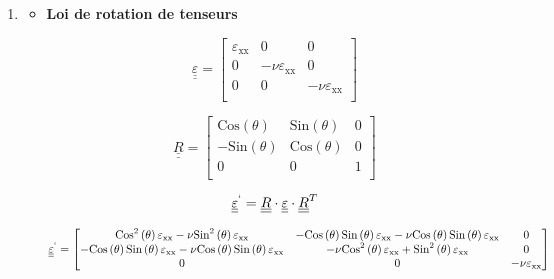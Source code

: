 \documentclass
[
a4paper,                      %
twoside,					  %
12pt,                         %
abstract,		      %
fleqn,                        %
]
{scrartcl} %
\begin{document}
\begin{enumerate}
\item 

\begin{itemize}
\item \textbf{Loi de rotation de tenseurs }

\begin{equation}
\underline{\underline{\varepsilon}}=\begin{bmatrix}
 \varepsilon _{\text{xx}} & 0 & 0 \\
 0 & -\nu  \varepsilon _{\text{xx}} & 0 \\
 0 & 0 & -\nu  \varepsilon _{\text{xx}} \\
\end{bmatrix}
\end{equation}

\begin{equation}
\underline{\underline{R}}=\begin{bmatrix}
  \text{Cos}\left(\theta\right) & \text{Sin}\left(\theta\right) & 0 \\
 -\text{Sin}\left(\theta\right) & \text{Cos}\left(\theta\right) & 0 \\
 0 & 0 & 1 \\
\end{bmatrix}
\end{equation}

\begin{equation}
\underline{\underline{\varepsilon}}^{`}=\underline{\underline{R}}\cdot\underline{\underline{\varepsilon}}\cdot\underline{\underline{R}}^{T}
\end{equation}

\begin{equation}
\underline{\underline{\varepsilon}}^{`}=\begin{bmatrix}
\text{Cos}^{2}\left(\theta\right) \varepsilon _{\text{xx}}-\nu  \text{Sin}^{2}\left(\theta\right) \varepsilon _{\text{xx}} & -\text{Cos}\left(\theta\right) \text{Sin}\left(\theta\right) \varepsilon
_{\text{xx}}-\nu  \text{Cos}\left(\theta\right) \text{Sin}\left(\theta\right) \varepsilon _{\text{xx}} & 0 \\
 -\text{Cos}\left(\theta\right) \text{Sin}\left(\theta\right) \varepsilon _{\text{xx}}-\nu  \text{Cos}\left(\theta\right) \text{Sin}\left(\theta\right) \varepsilon _{\text{xx}} & -\nu 
\text{Cos}^{2}\left(\theta\right) \varepsilon _{\text{xx}}+\text{Sin}^{2}\left(\theta\right) \varepsilon _{\text{xx}} & 0 \\
 0 & 0 & -\nu  \varepsilon _{\text{xx}} \\
\end{bmatrix}
\end{equation}


\end{itemize}
\end{enumerate}
\end{document}
